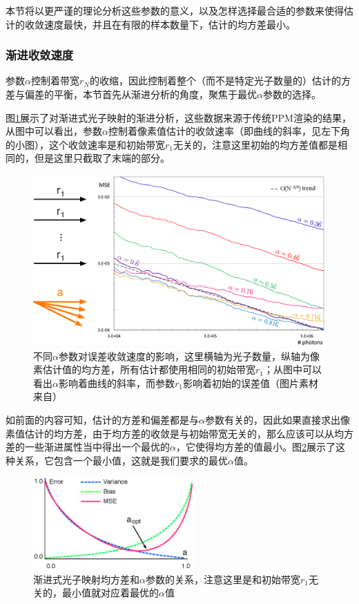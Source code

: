 本节将以更严谨的理论分析这些参数的意义，以及怎样选择最合适的参数来使得估计的收敛速度最快，并且在有限的样本数量下，估计的均方差最小。





\subsubsection{渐进收敛速度}
参数$\alpha$控制着带宽$r_N$的收缩，因此控制着整个（而不是特定光子数量的）估计的方差与偏差的平衡，本节首先从渐进分析的角度，聚焦于最优$\alpha$参数的选择。

图\ref{f:pm-alpha}展示了对渐进式光子映射的渐进分析，这些数据来源于传统PPM渲染的结果，从图中可以看出，参数$\alpha$控制着像素值估计的收敛速率（即曲线的斜率，见左下角的小图），这个收敛速率是和初始带宽$r_1$无关的，注意这里初始的均方差值都是相同的，但是这里只截取了末端的部分。

\begin{figure}
	\includegraphics[width=1.\textwidth]{figures/pm/alpha}
	\caption{不同$\alpha$参数对误差收敛速度的影响，这里横轴为光子数量，纵轴为像素估计值的均方差，所有估计都使用相同的初始带宽$r_1$；从图中可以看出$\alpha$影响着曲线的斜率，而参数$r_1$影响着初始的误差值（图片素材来自\cite{a:AdaptiveProgressivePhotonMapping}）}
	\label{f:pm-alpha}
\end{figure}

如前面的内容可知，估计的方差和偏差都是与$\alpha$参数有关的，因此如果直接求出像素值估计的均方差，由于均方差的收敛是与初始带宽无关的，那么应该可以从均方差的一些渐进属性当中得出一个最优的$\alpha$，它使得均方差的值最小。图\ref{f:pm-opt-a}展示了这种关系，它包含一个最小值，这就是我们要求的最优$\alpha$值。

\begin{figure}
	\sidecaption
	\includegraphics[width=0.55\textwidth]{figures/pm/opt-a}
	\caption{渐进式光子映射均方差和$\alpha$参数的关系，注意这里是和初始带宽$r_1$无关的，最小值就对应着最优的$\alpha$值}
	\label{f:pm-opt-a}
\end{figure}

